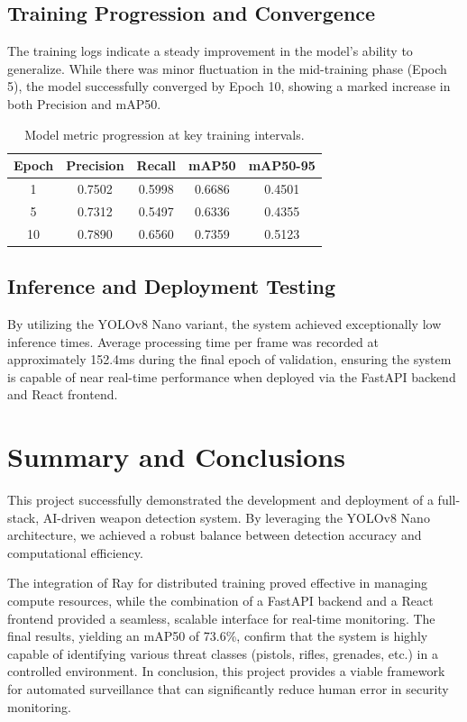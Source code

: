 \documentclass[12pt, a4paper]{report}
\begin{document}
\section{Training Progression and Convergence}
The training logs indicate a steady improvement in the model's ability to generalize.  While there was minor fluctuation in the mid-training phase (Epoch 5), the model successfully converged by Epoch 10, showing a marked increase in both Precision and mAP50. 

\begin{table}[h]
\centering
\begin{tabular}{|c|c|c|c|c|}
\hline
\textbf{Epoch} & \textbf{Precision} & \textbf{Recall} & \textbf{mAP50} & \textbf{mAP50-95} \\ \hline
1 & 0.7502 & 0.5998 & 0.6686 & 0.4501 \\ \hline
5 & 0.7312 & 0.5497 & 0.6336 & 0.4355 \\ \hline
10 & 0.7890 & 0.6560 & 0.7359 & 0.5123 \\ \hline
\end{tabular}
\caption{Model metric progression at key training intervals. }
\end{table}

\section{Inference and Deployment Testing}
By utilizing the YOLOv8 Nano variant, the system achieved exceptionally low inference times. Average processing time per frame was recorded at approximately 152.4ms during the final epoch of validation, ensuring the system is capable of near real-time performance when deployed via the FastAPI backend and React frontend.

\chapter{Summary and Conclusions}

This project successfully demonstrated the development and deployment of a full-stack, AI-driven weapon detection system. By leveraging the YOLOv8 Nano architecture, we achieved a robust balance between detection accuracy and computational efficiency. 

The integration of Ray for distributed training proved effective in managing compute resources, while the combination of a FastAPI backend and a React frontend provided a seamless, scalable interface for real-time monitoring. The final results, yielding an mAP50 of 73.6\%, confirm that the system is highly capable of identifying various threat classes (pistols, rifles, grenades, etc.) in a controlled environment.  In conclusion, this project provides a viable framework for automated surveillance that can significantly reduce human error in security monitoring.
\end{document}
